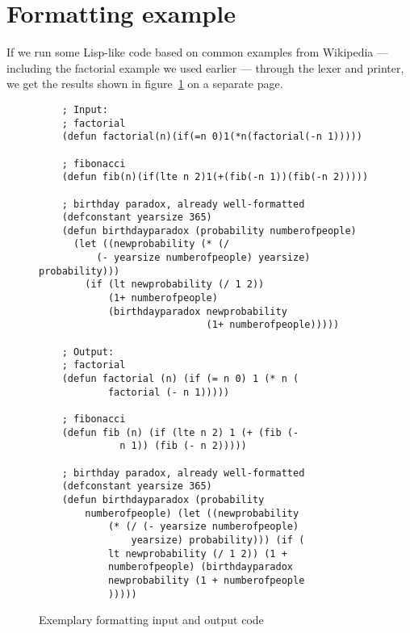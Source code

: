 \section{Formatting example}
If we run some Lisp-like code
based on common examples from Wikipedia ---
including the factorial example we used earlier ---
through the lexer and printer,
we get the results shown in figure~\ref{fig:formattingExample}
on a separate page.

\begin{figure}[p]
  \begin{verbatim}
    ; Input:
    ; factorial
    (defun factorial(n)(if(=n 0)1(*n(factorial(-n 1)))))

    ; fibonacci
    (defun fib(n)(if(lte n 2)1(+(fib(-n 1))(fib(-n 2)))))

    ; birthday paradox, already well-formatted
    (defconstant yearsize 365)
    (defun birthdayparadox (probability numberofpeople)
      (let ((newprobability (* (/
          (- yearsize numberofpeople) yearsize) probability)))
        (if (lt newprobability (/ 1 2))
            (1+ numberofpeople)
            (birthdayparadox newprobability
                             (1+ numberofpeople)))))

    ; Output:
    ; factorial
    (defun factorial (n) (if (= n 0) 1 (* n (
            factorial (- n 1)))))

    ; fibonacci
    (defun fib (n) (if (lte n 2) 1 (+ (fib (-
              n 1)) (fib (- n 2)))))

    ; birthday paradox, already well-formatted
    (defconstant yearsize 365)
    (defun birthdayparadox (probability
        numberofpeople) (let ((newprobability
            (* (/ (- yearsize numberofpeople)
                yearsize) probability))) (if (
            lt newprobability (/ 1 2)) (1 +
            numberofpeople) (birthdayparadox
            newprobability (1 + numberofpeople
            )))))
  \end{verbatim}
  \caption{Exemplary formatting input and
    output code}\label{fig:formattingExample}
\end{figure}
